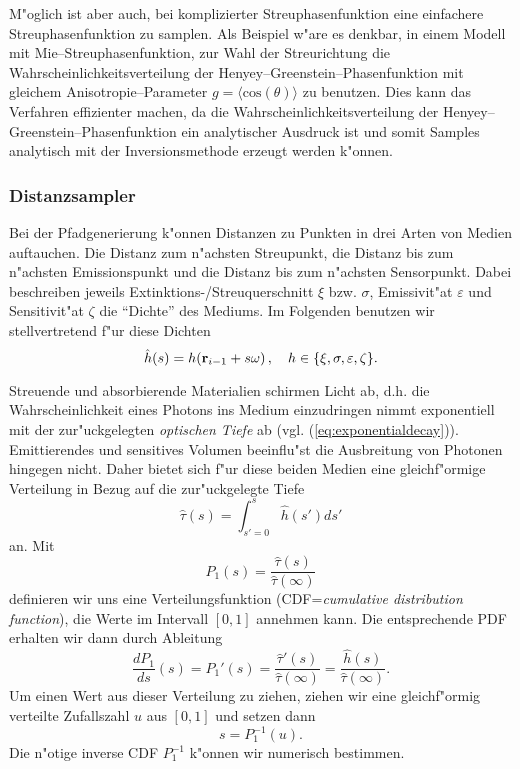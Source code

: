 	M"oglich ist aber auch, bei komplizierter Streuphasenfunktion eine einfachere Streuphasenfunktion zu samplen. Als Beispiel w"are es denkbar, in einem Modell mit Mie--Streuphasenfunktion, zur Wahl der Streurichtung die Wahrscheinlichkeitsverteilung der Henyey--Greenstein--Phasenfunktion mit gleichem Anisotropie--Parameter $g=\langle \text{cos}(\theta)\rangle$ zu benutzen. Dies kann das Verfahren effizienter machen, da die Wahrscheinlichkeitsverteilung der Henyey--Greenstein--Phasenfunktion ein analytischer Ausdruck ist und somit Samples analytisch mit der Inversionsmethode erzeugt werden k"onnen.
	
	\subsubsection{Distanzsampler}
	Bei der Pfadgenerierung k"onnen Distanzen zu Punkten in drei Arten von Medien auftauchen. Die Distanz zum n"achsten Streupunkt, die Distanz bis zum n"achsten Emissionspunkt und die Distanz bis zum n"achsten Sensorpunkt. Dabei beschreiben jeweils Extinktions-/Streuquerschnitt $\xi$ bzw. $\sigma$, Emissivit"at $\varepsilon$ und Sensitivit"at $\zeta$ die ``Dichte'' des Mediums. Im Folgenden benutzen wir stellvertretend f"ur diese Dichten
	$${\hat h}(s)=h(\mathbf{r}_{i-1}+s\omega)\,,\quad h\in\{\xi,\sigma,\varepsilon,\zeta\}.$$
	
	Streuende und absorbierende Materialien schirmen Licht ab, d.h. die Wahrscheinlichkeit eines Photons ins Medium einzudringen nimmt exponentiell mit der zur"uckgelegten {\em optischen Tiefe} ab (vgl. (\ref{eq:exponentialdecay})). Emittierendes und sensitives Volumen beeinflu"st die Ausbreitung von Photonen hingegen nicht. Daher bietet sich f"ur diese beiden Medien eine gleichf"ormige Verteilung in Bezug auf die zur"uckgelegte Tiefe
	$${\hat \tau}(s)=\int_{s'=0}^s {\hat h}(s')ds'$$
	an. Mit
	$$P_1(s)=\frac{{\hat \tau}(s)}{{\hat \tau}(\infty)}$$
	definieren wir uns eine Verteilungsfunktion (CDF={\em cumulative distribution function}), die Werte im Intervall $[0,1]$ annehmen kann. Die entsprechende PDF erhalten wir dann durch Ableitung
	$$\frac{dP_1}{ds}(s)=P_1'(s)=\frac{{\hat \tau}'(s)}{{\hat \tau}(\infty)}=\frac{{\hat h}(s)}{{\hat \tau}(\infty)}.$$
	Um einen Wert aus dieser Verteilung zu ziehen, ziehen wir eine gleichf"ormig verteilte Zufallszahl $u$ aus $[0,1]$ und setzen dann
	$$s=P_1^{-1}(u).$$
	Die n"otige inverse CDF $P_1^{-1}$ k"onnen wir numerisch bestimmen.
	
